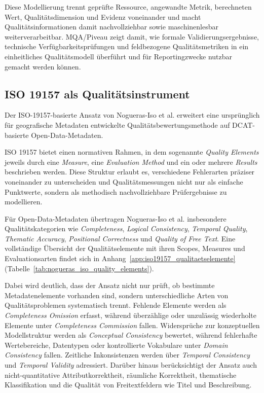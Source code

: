 Diese Modellierung trennt geprüfte Ressource, angewandte Metrik, berechneten Wert, Qualitätsdimension und Evidenz voneinander und macht Qualitätsinformationen damit nachvollziehbar sowie maschinenlesbar weiterverarbeitbar. MQA/Piveau zeigt damit, wie formale Validierungsergebnisse, technische Verfügbarkeitsprüfungen und feldbezogene Qualitätsmetriken in ein einheitliches Qualitätsmodell überführt und für Reportingzwecke nutzbar gemacht werden können. 

\pagebreak

\subsection{ISO 19157 als Qualitätsinstrument}

Der ISO-19157-basierte Ansatz von Nogueras-Iso et al. erweitert eine ursprünglich für geografische Metadaten entwickelte Qualitätsbewertungsmethode auf DCAT-basierte Open-Data-Metadaten. 

ISO 19157 bietet einen normativen Rahmen, in dem sogenannte \textit{Quality Elements} jeweils durch eine \textit{Measure}, eine \textit{Evaluation Method} und ein oder mehrere \textit{Results} beschrieben werden. Diese Struktur erlaubt es, verschiedene Fehlerarten präziser voneinander zu unterscheiden und Qualitätsmessungen nicht nur als einfache Punktwerte, sondern als methodisch nachvollziehbare Prüfergebnisse zu modellieren. \cite{noguerasiso_quality_metadata}

Für Open-Data-Metadaten übertragen Nogueras-Iso et al. insbesondere Qualitätskategorien wie \textit{Completeness}, \textit{Logical Consistency}, \textit{Temporal Quality}, \textit{Thematic Accuracy}, \textit{Positional Correctness} und \textit{Quality of Free Text}. Eine vollständige Übersicht der Qualitätselemente mit ihren Scopes, Measures und Evaluationsarten findet sich in Anhang~\ref{app:iso19157_qualitaetselemente} (Tabelle~\ref{tab:nogueras_iso_quality_elements}).

Dabei wird deutlich, dass der Ansatz nicht nur prüft, ob bestimmte Metadatenelemente vorhanden sind, sondern unterschiedliche Arten von Qualitätsproblemen systematisch trennt. Fehlende Elemente werden als \textit{Completeness Omission} erfasst, während überzählige oder unzulässig wiederholte Elemente unter \textit{Completeness Commission} fallen. Widersprüche zur konzeptuellen Modellstruktur werden als \textit{Conceptual Consistency} bewertet, während fehlerhafte Wertebereiche, Datentypen oder kontrollierte Vokabulare unter \textit{Domain Consistency} fallen. Zeitliche Inkonsistenzen werden über \textit{Temporal Consistency} und \textit{Temporal Validity} adressiert. Darüber hinaus berücksichtigt der Ansatz auch nicht-quantitative Attributkorrektheit, räumliche Korrektheit, thematische Klassifikation und die Qualität von Freitextfeldern wie Titel und Beschreibung.

